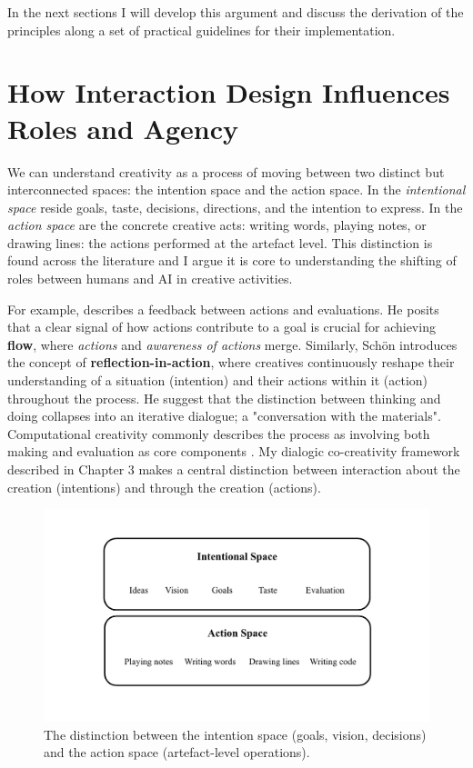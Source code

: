 In the next sections I will develop this argument and discuss the derivation of the principles along a set of practical guidelines for their implementation.

\section{How Interaction Design Influences Roles and Agency}

We can understand creativity as a process of moving between two distinct but interconnected spaces: the intention space and the action space. In the \textit{intentional space} reside goals, taste, decisions, directions, and the intention to express. In the \textit{action space} are the concrete creative acts: writing words, playing notes, or drawing lines: the actions performed at the artefact level. This distinction is found across the literature and I argue it is core to understanding the shifting of roles between humans and AI in creative activities.

For example, \cite{Csikszentmihalyi1997-ui} describes a feedback between actions and evaluations. He posits that a clear signal of how actions contribute to a goal is crucial for achieving \textbf{flow}, where \textit{actions} and \textit{awareness of actions} merge. Similarly, Schön \cite{Schon1992-jt} introduces the concept of \textbf{reflection-in-action}, where creatives continuously reshape their understanding of a situation (intention) and their actions within it (action) throughout the process. He suggest that the distinction between thinking and doing collapses into an iterative dialogue; a "conversation with the materials". Computational creativity commonly describes the process as involving both making and evaluation as core components \cite{Colton2011-vl}. My dialogic co-creativity framework described in Chapter 3 makes a central distinction between interaction about the creation (intentions) and through the creation (actions). 

\begin{figure}[H]
 \centering
\includegraphics[width=1\linewidth]{intention action spaces.png}
 \caption{The distinction between the intention space (goals, vision, decisions) and the action space (artefact-level operations).}
 \label{fig:intention-action-spaces}
\end{figure}


